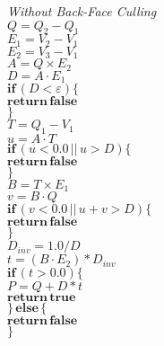 \begin{minipage}[t]{.5\textwidth}
\raggedright
\textit{Without Back-Face Culling}\\
\vspace{1em}
$Q = Q_2 - Q_1$\\
$E_1 = V_2 - V_1$\\
$E_2 = V_3 - V_1$\\
$A = Q \times E_2$\\
$D = A \cdot E_1$\\
$\mathbf{if} \, (D < \varepsilon) \{$\\
\quad $\mathbf{return \, false}$\\
$\}$\\
$T = Q_1 - V_1$\\
$u = A \cdot T$\\
$\mathbf{if} \, (u < 0.0 \, || \, u > D) \{$\\
\quad $\mathbf{return \, false}$\\
$\}$\\
$B = T \times E_1$\\
$v = B \cdot Q$\\
$\mathbf{if} \, (v < 0.0 \, || \, u + v > D) \{$\\
\quad \quad $\mathbf{return \, false}$\\
$\}$\\
$D_{inv} = 1.0 / D$\\
$t = (B \cdot E_2) * D_{inv}$\\
$\mathbf{if} \, (t > 0.0) \{$\\
\quad $P = Q + D * t$\\
\quad $\mathbf{return \, true}$\\
$\} \, \mathbf{else} \, \{$\\
\quad $\mathbf{return \, false}$\\
$\}$
\end{minipage}